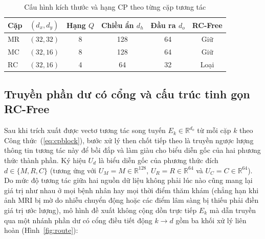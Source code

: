 \begin{table}[H]
\centering\small
\caption{Cấu hình kích thước và hạng CP theo từng cặp tương tác}
\label{tab:cpconfig}
\begin{tabular}{lccccc}
\toprule
Cặp & $(d_x,d_y)$ & Hạng $Q$ & Chiều ẩn $d_h$ & Đầu ra $d_o$ & RC-Free \\
\midrule
MR & $(32,32)$ & 8 & 128 & 64 & Giữ \\
MC & $(32,16)$ & 8 & 128 & 64 & Giữ \\
RC & $(32,16)$ & 4 & 64 & 32 & Loại \\
\bottomrule
\end{tabular}
\end{table}

\subsection{Truyền phần dư có cổng và cấu trúc tinh gọn RC-Free}
\label{sec:gated-routing}
\label{sec:rcfree-method}
Sau khi trích xuất được vectơ tương tác song tuyến $E_k\in\mathbb R^{d_o}$ từ mỗi cặp $k$ theo Công thức~(\ref{eq:cpblock}), bước xử lý then chốt tiếp theo là truyền ngược lượng thông tin tương tác này để bồi đắp và làm giàu cho biểu diễn gốc của hai phương thức thành phần. Ký hiệu $U_d$ là biểu diễn gốc của phương thức đích $d\in\{M,R,C\}$ (tương ứng với $U_M=M\in\mathbb R^{128}$, $U_R=R\in\mathbb R^{64}$ và $U_C=C\in\mathbb R^{64}$). Do mức độ tương tác giữa hai nguồn dữ liệu không phải lúc nào cũng mang lại giá trị như nhau ở mọi bệnh nhân hay mọi thời điểm thăm khám (chẳng hạn khi ảnh MRI bị mờ do nhiễu chuyển động hoặc các điểm lâm sàng bị thiếu phải điền giá trị ước lượng), mô hình đề xuất không cộng dồn trực tiếp $E_k$ mà dẫn truyền qua một nhánh phần dư có cổng điều tiết động $k\to d$ gồm ba khối xử lý liên hoàn (Hình~\ref{fig:route}):
